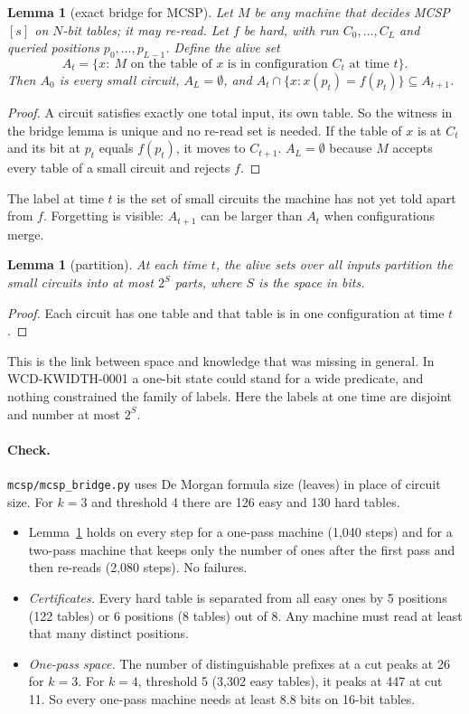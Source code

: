 \documentclass[11pt]{article}
\newtheorem{lemma}[theorem]{Lemma}
\begin{document}
\begin{lemma}[exact bridge for MCSP]\label{lem:mcsp}
Let $M$ be any machine that decides MCSP$[s]$ on $N$-bit tables; it may re-read. Let $f$ be hard, with run $C_0,\dots,C_L$ and queried positions $p_0,\dots,p_{L-1}$. Define the \emph{alive set}
\[A_t=\{x:\ M\text{ on the table of }x\text{ is in configuration }C_t\text{ at time }t\}.\]
Then $A_0$ is every small circuit, $A_L=\emptyset$, and $A_t\cap\{x:x(p_t)=f(p_t)\}\subseteq A_{t+1}$.
\end{lemma}
\begin{proof}
A circuit satisfies exactly one total input, its own table. So the witness in the bridge lemma is unique and no re-read set is needed. If the table of $x$ is at $C_t$ and its bit at $p_t$ equals $f(p_t)$, it moves to $C_{t+1}$. $A_L=\emptyset$ because $M$ accepts every table of a small circuit and rejects $f$.
\end{proof}
The label at time $t$ is the set of small circuits the machine has not yet told apart from $f$. Forgetting is visible: $A_{t+1}$ can be larger than $A_t$ when configurations merge.

\begin{lemma}[partition]\label{lem:part}
At each time $t$, the alive sets over all inputs partition the small circuits into at most $2^{S}$ parts, where $S$ is the space in bits.
\end{lemma}
\begin{proof}
Each circuit has one table and that table is in one configuration at time $t$.
\end{proof}
This is the link between space and knowledge that was missing in general. In WCD-KWIDTH-0001 a one-bit state could stand for a wide predicate, and nothing constrained the family of labels. Here the labels at one time are disjoint and number at most $2^{S}$.

\paragraph{Check.} \texttt{mcsp/mcsp\_bridge.py} uses De Morgan formula size (leaves) in place of circuit size. For $k=3$ and threshold 4 there are 126 easy and 130 hard tables.
\begin{itemize}
\item Lemma~\ref{lem:mcsp} holds on every step for a one-pass machine (1{,}040 steps) and for a two-pass machine that keeps only the number of ones after the first pass and then re-reads (2{,}080 steps). No failures.
\item \emph{Certificates.} Every hard table is separated from all easy ones by 5 positions (122 tables) or 6 positions (8 tables) out of 8. Any machine must read at least that many distinct positions.
\item \emph{One-pass space.} The number of distinguishable prefixes at a cut peaks at 26 for $k=3$. For $k=4$, threshold 5 (3{,}302 easy tables), it peaks at 447 at cut 11. So every one-pass machine needs at least 8.8 bits on 16-bit tables.
\end{itemize}
\end{document}
